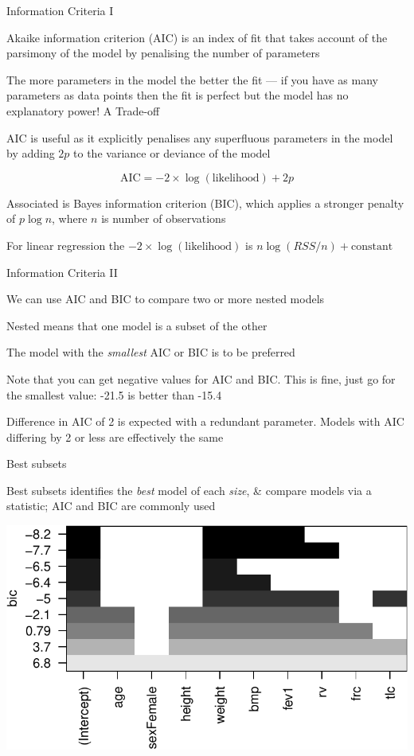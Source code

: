 \documentclass[10pt,ignorenonframetext,compress, aspectratio=169]{beamer}
\begin{document}
\begin{frame}{Information Criteria I}

\alert{Akaike information criterion} (AIC) is an index of fit that takes
account of the parsimony of the model by penalising the number of
parameters

The more parameters in the model the better the fit --- if you have as
many parameters as data points then the fit is perfect but the model has
no explanatory power! A Trade-off

AIC is useful as it explicitly penalises any superfluous parameters in
the model by adding \(2p\) to the variance or deviance of the model

\[\mathrm{AIC} = -2 \times \log(\mathrm{likelihood}) + 2p\]

Associated is Bayes information criterion (BIC), which applies a
stronger penalty of \(p \log n\), where \(n\) is number of observations

For linear regression the \(-2 \times \log(\mathrm{likelihood})\) is
\(n \log(RSS/n) + \mathrm{constant}\)

\end{frame}

\begin{frame}{Information Criteria II}

We can use AIC and BIC to compare two or more \alert{nested} models

Nested means that one model is a subset of the other

The model with the \emph{smallest} AIC or BIC is to be preferred

Note that you can get negative values for AIC and BIC. This is fine,
just go for the smallest value: -21.5 is better than -15.4

Difference in AIC of 2 is expected with a redundant parameter. Models
with AIC differing by 2 or less are effectively the same

\end{frame}

\begin{frame}{Best subsets}

\alert{Best subsets} identifies the \emph{best} model of each
\emph{size}, \& compare models via a statistic; \alert{AIC} and
\alert{BIC} are commonly used

\begin{center}\includegraphics[width=0.7\linewidth]{03-linear-models_files/figure-beamer/best-subsets-1} \end{center}

\end{frame}
\end{document}

